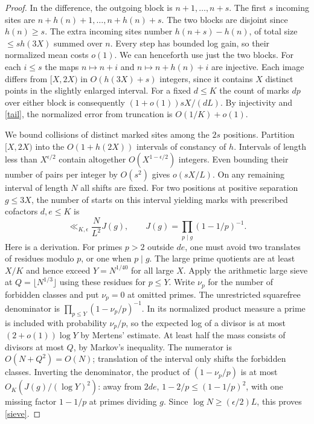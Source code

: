 \documentclass[10pt]{article}
\begin{document}
\begin{proof}
In the difference, the outgoing block is $n+1,\ldots,n+s$. The first $s$ incoming sites are $n+h(n)+1,\ldots,n+h(n)+s$. The two blocks are disjoint since $h(n)\ge s$. The extra incoming sites number $h(n+s)-h(n)$, of total size $\le s h(3X)$ summed over $n$. Every step has bounded log gain, so their normalized mean costs $o(1)$. We can henceforth use just the two blocks. For each $i\le s$ the maps $n\mapsto n+i$ and $n\mapsto n+h(n)+i$ are injective. Each image differs from $[X,2X)$ in $O(h(3X)+s)$ integers, since it contains $X$ distinct points in the slightly enlarged interval. For a fixed $d\le K$ the count of marks $dp$ over either block is consequently $(1+o(1))sX/(dL)$. By injectivity and \eqref{tail}, the normalized error from truncation is $O(1/K)+o(1)$.

We bound collisions of distinct marked sites among the $2s$ positions. Partition $[X,2X)$ into the $O(1+h(2X))$ intervals of constancy of $h$. Intervals of length less than $X^{\epsilon/2}$ contain altogether $O(X^{1-\epsilon/2})$ integers. Even bounding their number of pairs per integer by $O(s^2)$ gives $o(sX/L)$. On any remaining interval of length $N$ all shifts are fixed. For two positions at positive separation $g\le 3X$, the number of starts on this interval yielding marks with prescribed cofactors $d,e\le K$ is
\begin{equation}\label{sieve}
 \ll_{K,\epsilon}\frac{N}{L^2}J(g),
 \qquad J(g)=\prod_{p\mid g}(1-1/p)^{-1}.
\end{equation}
Here is a derivation. For primes $p>2$ outside $de$, one must avoid two translates of residues modulo $p$, or one when $p\mid g$. The large prime quotients are at least $X/K$ and hence exceed $Y=N^{1/40}$ for all large $X$. Apply the arithmetic large sieve \cite{Kow} at $Q=\lfloor N^{1/3}\rfloor$ using these residues for $p\le Y$. Write $\nu_p$ for the number of forbidden classes and put $\nu_p=0$ at omitted primes. The unrestricted squarefree denominator is $\prod_{p\le Y}(1-\nu_p/p)^{-1}$. In its normalized product measure a prime is included with probability $\nu_p/p$, so the expected log of a divisor is at most $(2+o(1))\log Y$ by Mertens' estimate. At least half the mass consists of divisors at most $Q$, by Markov's inequality. The numerator is $O(N+Q^2)=O(N)$; translation of the interval only shifts the forbidden classes. Inverting the denominator, the product of $(1-\nu_p/p)$ is at most $O_K(J(g)/(\log Y)^2)$: away from $2de$, $1-2/p\le(1-1/p)^2$, with one missing factor $1-1/p$ at primes dividing $g$. Since $\log N\ge(\epsilon/2)L$, this proves \eqref{sieve}.


\end{proof}
\end{document}
